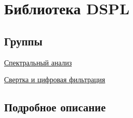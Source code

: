 \hypertarget{group___m_a_i_n___g_r_o_u_p}{}\section{Библиотека D\+S\+P\+L}
\label{group___m_a_i_n___g_r_o_u_p}
\subsection*{Группы}
\begin{DoxyCompactItemize}
\item 
\hyperlink{group___s_p_e_c_t_r_a_l___g_r_o_u_p}{Спектральный анализ}
\item 
\hyperlink{group___c_o_n_v___g_r_o_u_p}{Свертка и цифровая фильтрация}
\end{DoxyCompactItemize}


\subsection{Подробное описание}
